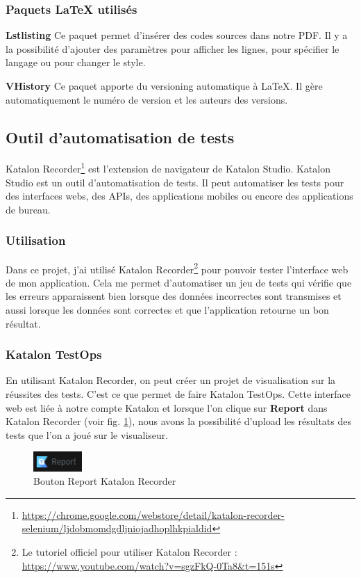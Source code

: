 \documentclass[a4paper,14pt]{extarticle}
\begin{document}
{\subsubsection{Paquets \LaTeX{} utilisés}

\noindent\textbf{Lstlisting}
Ce paquet permet d'insérer des codes sources dans notre PDF. Il y a la possibilité d'ajouter des paramètres pour afficher les lignes, pour spécifier le langage ou pour changer le style.

\noindent\textbf{VHistory}
Ce paquet apporte du versioning automatique à \LaTeX. Il gère automatiquement le numéro de version et les auteurs des versions.

\subsection{Outil d'automatisation de tests}
\label{outilAutomatisationTest}

Katalon Recorder\footnote{\url{https://chrome.google.com/webstore/detail/katalon-recorder-selenium/ljdobmomdgdljniojadhoplhkpialdid}} est l'extension de navigateur de Katalon Studio. Katalon Studio est un outil d'automatisation de tests. Il peut automatiser les tests pour des interfaces webs, des APIs, des applications mobiles ou encore des applications de bureau.

\subsubsection{Utilisation}

Dans ce projet, j'ai utilisé Katalon Recorder\footnote{Le tutoriel officiel pour utiliser Katalon Recorder : \url{https://www.youtube.com/watch?v=sgzFkQ-0Ta8&t=151s}} pour pouvoir tester l'interface web de mon application. Cela me permet d'automatiser un jeu de tests qui vérifie que les erreurs apparaissent bien lorsque des données incorrectes sont transmises et aussi lorsque les données sont correctes et que l'application retourne un bon résultat.

\subsubsection{Katalon TestOps}

En utilisant Katalon Recorder, on peut créer un projet de visualisation sur la réussites des tests. C'est ce que permet de faire Katalon TestOps. Cette interface web est liée à notre compte Katalon et lorsque l'on clique sur \textbf{Report} dans Katalon Recorder (voir fig. \ref{fig:reportKatalonRecorder}), nous avons la possibilité d'upload les résultats des tests que l'on a joué sur le visualiseur.
\begin{figure}[htp]
    \centering
    \includegraphics[width=5em]{../img/reportKatalonRecorder.png}
    \caption{Bouton Report Katalon Recorder}
    \label{fig:reportKatalonRecorder}
\end{figure}

}
\end{document}
